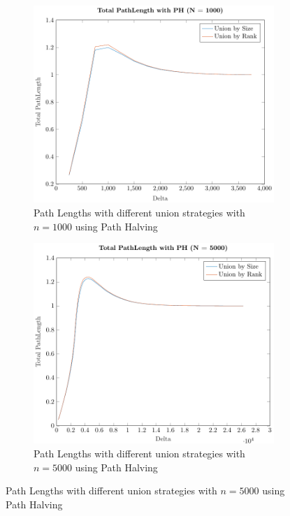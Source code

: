 \begin{figure}[ht]
    \begin{subfigure}{0.32\textwidth}
        \centering
        \includegraphics[width=\textwidth]{../images/plotPHNonFull1000_PathLength.pdf}
        \caption{Path Lengths with different union strategies with $n = 1000$ using Path Halving}
    \end{subfigure}%
    \hfill
    \begin{subfigure}{0.32\textwidth}
        \centering
        \includegraphics[width=\textwidth]{../images/plotPHNonFull5000_PathLength.pdf}
        \caption{Path Lengths with different union strategies with $n = 5000$ using Path Halving}

\end{subfigure}
\end{figure}
